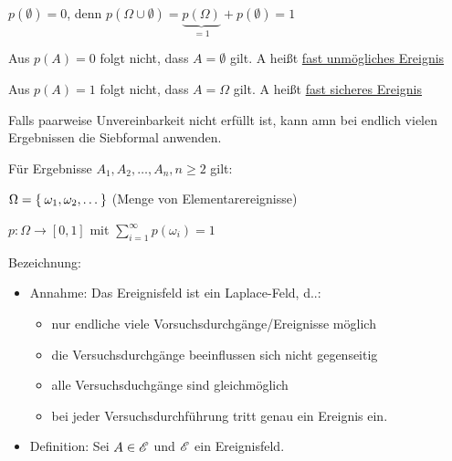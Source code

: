 \documentclass{../tudscript}
\begin{document}
$p(\emptyset) = 0$, denn $p(\Omega \cup \emptyset) = \underbrace{p(\Omega)}_{=1} + p(\emptyset) = 1$

Aus $p(A) = 0$ folgt nicht, dass $A = \emptyset$ gilt. A heißt \underline{fast unmögliches Ereignis}

Aus $p(A) = 1$ folgt nicht, dass $A = \Omega$ gilt. A heißt \underline{fast sicheres Ereignis}

Falls paarweise Unvereinbarkeit nicht erfüllt ist, kann amn bei endlich vielen Ergebnissen die Siebformal anwenden.

Für Ergebnisse $A_1, A_2, \ldots, A_n, n \geq 2$ gilt:


$\Omega = \Set{\omega_1, \omega_2, \ldots}$ (Menge von Elementarereignisse)

$p: \Omega  \rightarrow [0,1]$ mit $\sum_{i =1}^\infty p(\omega_i) = 1$

Bezeichnung:



\begin{itemize}
\item Annahme: Das Ereignisfeld ist ein Laplace-Feld, d..:
\begin{itemize}
\item nur endliche viele Vorsuchsdurchgänge/Ereignisse möglich
\item die Versuchsdurchgänge beeinflussen sich nicht gegenseitig
\item alle Versuchsduchgänge sind gleichmöglich
\item bei jeder Versuchsdurchführung tritt genau ein Ereignis ein.
\end{itemize}
\item Definition: Sei $A \in \mathscr{E}$ und $\mathscr{E}$ ein Ereignisfeld.
\end{itemize}
\end{document}
